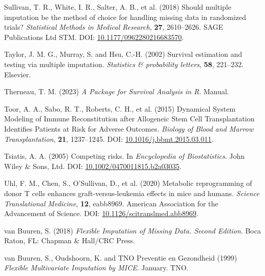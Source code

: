 \documentclass[
  letterpaper,
  DIV=11,
  numbers=noendperiod]{scrreprt}
\newlength{\cslhangindent}
\newlength{\cslentryspacingunit} %
\newenvironment{CSLReferences}[2] %
 {%
  \setlength{\parindent}{0pt}
  \ifodd #1
  \let\oldpar\par
  \def\par{\hangindent=\cslhangindent\oldpar}
  \fi
  \setlength{\parskip}{#2\cslentryspacingunit}
 }%
 {}
\begin{document}
\begin{CSLReferences}{1}{0}
\leavevmode{}%
Sullivan, T. R., White, I. R., Salter, A. B., et al. (2018) Should
multiple imputation be the method of choice for handling missing data in
randomized trials? \emph{Statistical Methods in Medical Research},
\textbf{27}, 2610--2626. SAGE Publications Ltd STM. DOI:
\href{https://doi.org/10.1177/0962280216683570}{10.1177/0962280216683570}.

\leavevmode{}%
Taylor, J. M. G., Murray, S. and Hsu, C.-H. (2002) Survival estimation
and testing via multiple imputation. \emph{Statistics \& probability
letters}, \textbf{58}, 221--232. Elsevier.

\leavevmode{}%
Therneau, T. M. (2023) \emph{A Package for Survival Analysis in {R}}.
Manual.

\leavevmode{}%
Toor, A. A., Sabo, R. T., Roberts, C. H., et al. (2015) Dynamical
{System Modeling} of {Immune Reconstitution} after {Allogeneic Stem Cell
Transplantation Identifies Patients} at {Risk} for {Adverse Outcomes}.
\emph{Biology of Blood and Marrow Transplantation}, \textbf{21},
1237--1245. DOI:
\href{https://doi.org/10.1016/j.bbmt.2015.03.011}{10.1016/j.bbmt.2015.03.011}.

\leavevmode{}%
Tsiatis, A. A. (2005) Competing risks. In \emph{Encyclopedia of
Biostatistics}. John Wiley \& Sons, Ltd. DOI:
\href{https://doi.org/10.1002/0470011815.b2a03035}{10.1002/0470011815.b2a03035}.

\leavevmode{}%
Uhl, F. M., Chen, S., O'Sullivan, D., et al. (2020) Metabolic
reprogramming of donor {T} cells enhances graft-versus-leukemia effects
in mice and humans. \emph{Science Translational Medicine}, \textbf{12},
eabb8969. American Association for the Advancement of Science. DOI:
\href{https://doi.org/10.1126/scitranslmed.abb8969}{10.1126/scitranslmed.abb8969}.

\leavevmode{}%
van Buuren, S. (2018) \emph{Flexible Imputation of Missing Data.
{Second} Edition}. Boca Raton, FL: Chapman \& Hall/CRC Press.

\leavevmode{}%
van Buuren, S., Oudshoorn, K. and TNO Preventie en Gezondheid (1999)
\emph{Flexible {Multivariate Imputation} by {MICE}}. January. TNO.


\end{CSLReferences}
\end{document}
